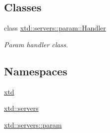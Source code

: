 \subsection*{Classes}
\begin{DoxyCompactItemize}
\item 
class \hyperlink{classxtd_1_1servers_1_1param_1_1Handler}{xtd\-::servers\-::param\-::\-Handler}
\begin{DoxyCompactList}\small\item\em Param handler class. \end{DoxyCompactList}\end{DoxyCompactItemize}
\subsection*{Namespaces}
\begin{DoxyCompactItemize}
\item 
\hyperlink{namespacextd}{xtd}
\item 
\hyperlink{namespacextd_1_1servers}{xtd\-::servers}
\item 
\hyperlink{namespacextd_1_1servers_1_1param}{xtd\-::servers\-::param}
\end{DoxyCompactItemize}
